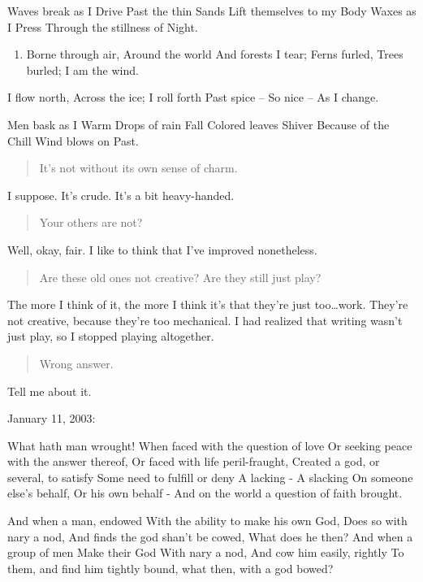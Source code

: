 Waves break as I Drive Past the thin Sands Lift themselves to my Body Waxes as I Press Through the stillness of Night.

\begin{enumerate}
\def\labelenumi{\Roman{enumi}.}
\setcounter{enumi}{3}
\tightlist
\item
  Borne through air, Around the world And forests I tear; Ferns furled, Trees burled; I am the wind.
\end{enumerate}

I flow north, Across the ice; I roll forth Past spice -- So nice -- As I change.

Men bask as I Warm Drops of rain Fall Colored leaves Shiver Because of the Chill Wind blows on Past.

\begin{quote}
It's not without its own sense of charm.
\end{quote}

I suppose. It's crude. It's a bit heavy-handed.

\begin{quote}
Your others are not?
\end{quote}

Well, okay, fair. I like to think that I've improved nonetheless.

\begin{quote}
Are these old ones not creative? Are they still just play?
\end{quote}

The more I think of it, the more I think it's that they're just too\ldots{}work. They're not creative, because they're too mechanical. I had realized that writing wasn't just play, so I stopped playing altogether.

\begin{quote}
Wrong answer.
\end{quote}

Tell me about it.

January 11, 2003:

What hath man wrought! When faced with the question of love Or seeking peace with the answer thereof, Or faced with life peril-fraught, Created a god, or several, to satisfy Some need to fulfill or deny A lacking - A slacking On someone else's behalf, Or his own behalf - And on the world a question of faith brought.

And when a man, endowed With the ability to make his own God, Does so with nary a nod, And finds the god shan't be cowed, What does he then? And when a group of men Make their God With nary a nod, And cow him easily, rightly To them, and find him tightly bound, what then, with a god bowed?

